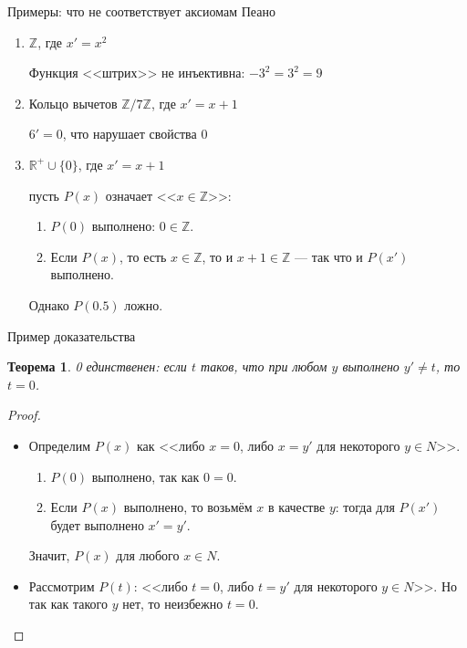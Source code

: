 \documentclass[aspectratio=169]{beamer}
\newtheorem{thm}{Теорема}[section]
\begin{document}
\begin{frame}{Примеры: что не соответствует аксиомам Пеано}
\begin{enumerate}
\item $\mathbb{Z}$, где $x' = x^2$\\\pause

Функция <<штрих>> не инъективна: $-3^2 = 3^2 = 9$\pause

\item Кольцо вычетов $\mathbb{Z}/{7\mathbb{Z}}$, где $x' = x+1$\\\pause

$6' = 0$, что нарушает свойства $0$\pause

\item $\mathbb{R^+}\cup\{0\}$, где $x' = x+1$\\\pause

пусть $P(x)$ означает <<$x \in \mathbb{Z}$>>:\pause \begin{enumerate}
\item $P(0)$ выполнено: $0 \in \mathbb{Z}$.\pause
\item Если $P(x)$, то есть $x \in \mathbb{Z}$, то и $x+1 \in \mathbb{Z}$ --- так
что и $P(x')$ выполнено.\pause
\end{enumerate}
Однако $P(0.5)$ ложно.
\end{enumerate}
\end{frame}

\begin{frame}{Пример доказательства}
\begin{thm}0 единственен: если $t$ таков, что при любом $y$ 
выполнено $y' \ne t$, то $t = 0$.
\end{thm}\pause
\begin{proof}

\begin{itemize}
\item Определим $P(x)$ как <<либо $x = 0$, либо $x = y'$ для некоторого $y \in N$>>.\pause
\begin{enumerate}
\item $P(0)$ выполнено, так как $0 = 0$.\pause
\item Если $P(x)$ выполнено, то возьмём $x$ в качестве $y$: тогда для $P(x')$
будет выполнено $x' = y'$.\pause
\end{enumerate}
Значит, $P(x)$ для любого $x \in N$.\pause

\item Рассмотрим $P(t)$: <<либо $t = 0$, либо $t = y'$ для некоторого $y \in N$>>.
Но так как такого $y$ нет, то неизбежно $t = 0$.
\end{itemize}
\end{proof}
\end{frame}
\end{document}
